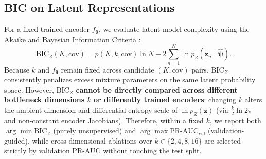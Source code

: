 \subsection{BIC on Latent Representations}
\label{sec:p2_bic_latents}
For a fixed trained encoder $f_{\boldsymbol{\theta}}$, we evaluate latent model complexity using the Akaike and Bayesian Information Criteria \cite{akaike1974new, schwarz1978estimating}:
\begin{equation}
    \text{BIC}_Z(K, \text{cov}) = p(K, k, \text{cov}) \ln N - 2 \sum_{n=1}^{N} \ln p_Z(\mathbf{z}_n \mid \hat{\boldsymbol{\psi}}).
    \label{eq:latent_bic}
\end{equation}
Because $k$ and $f_{\boldsymbol{\theta}}$ remain fixed across candidate $(K, \text{cov})$ pairs, $\text{BIC}_Z$ consistently penalizes excess mixture parameters on the same latent probability space. However, \textbf{$\text{BIC}_Z$ cannot be directly compared across different bottleneck dimensions $k$ or differently trained encoders}: changing $k$ alters the ambient dimension and differential entropy scale of $\ln p_Z(\mathbf{z})$ (via $\frac{k}{2}\ln 2\pi$ and non-constant encoder Jacobians). Therefore, within a fixed $k$, we report both $\arg\min \text{BIC}_Z$ (purely unsupervised) and $\arg\max \text{PR-AUC}_{\text{val}}$ (validation-guided), while cross-dimensional ablations over $k \in \{2,4,8,16\}$ are selected strictly by validation PR-AUC without touching the test split.
